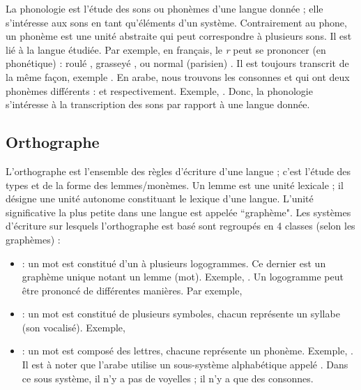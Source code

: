 \documentclass{KodeBook}
\begin{document}
La phonologie est l'étude des sons ou phonèmes d'une langue donnée ; elle s'intéresse aux sons en tant qu'éléments d'un système. 
Contrairement au phone, un phonème est une unité abstraite qui peut correspondre à plusieurs sons.
Il est lié à la langue étudiée. 
Par exemple, en français, le \textit{r} peut se prononcer (en phonétique) : roulé \expword{\textipa{[r]}}, grasseyé \expword{\textipa{[\;R]}}, ou normal (parisien) \expword{\textipa{[K]}}. 
Il est toujours transcrit de la même façon, exemple . 
En arabe, nous trouvons les consonnes  et  qui ont deux phonèmes différents :  et  respectivement. 
Exemple, . 
Donc, la phonologie s'intéresse à la transcription des sons par rapport à une langue donnée.

\subsection{Orthographe}

L'orthographe est l'ensemble des règles d'écriture d'une langue ; c'est l'étude des types et de la forme des lemmes/monèmes. 
Un lemme est une unité lexicale ; il désigne une unité autonome constituant le lexique d'une langue.
L'unité significative la plus petite dans une langue est appelée ``graphème".
Les systèmes d'écriture sur lesquels l'orthographe est basé sont regroupés en 4 classes (selon les graphèmes) : 
\begin{itemize}
	\item {} : un mot est constitué d'un à plusieurs logogrammes.
	Ce dernier est un graphème unique notant un lemme (mot).
	Exemple, .
	Un logogramme peut être prononcé de différentes manières. 
	Par exemple, 
	
	\item {} : un mot est constitué de plusieurs symboles, chacun représente un syllabe (son vocalisé). 
	Exemple, 
	
	\item {} : un mot est composé des lettres, chacune représente un phonème. 
	Exemple, . 
	Il est à noter que l'arabe utilise un sous-système alphabétique appelé . 
	Dans ce sous système, il n'y a pas de voyelles ; il n'y a que des consonnes.
\end{itemize}
\end{document}
